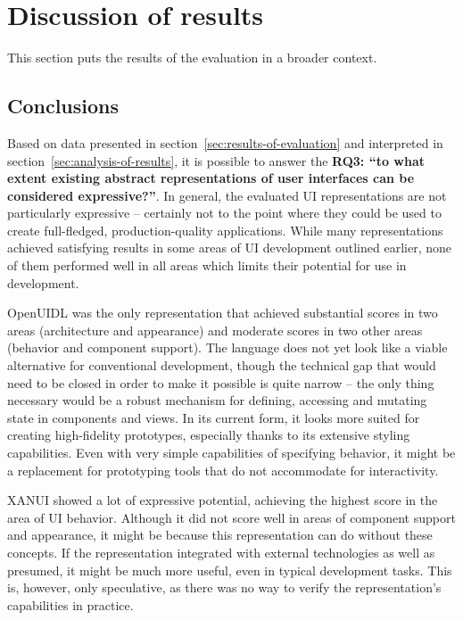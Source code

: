 \section{Discussion of results}\label{sec:evaluation-discussion-of-results}

This section puts the results of the evaluation in a broader context.

\subsection{Conclusions}\label{subsec:conclusions}

Based on data presented in section~\ref{sec:results-of-evaluation} and interpreted in section~\ref{sec:analysis-of-results}, it is possible to answer the \textbf{RQ3: \enquote{to what extent existing abstract representations of user interfaces can be considered expressive?}}.
In general, the evaluated UI representations are not particularly expressive -- certainly not to the point where they could be used to create full-fledged, production-quality applications.
While many representations achieved satisfying results in some areas of UI development outlined earlier, none of them performed well in all areas which limits their potential for use in development.

OpenUIDL was the only representation that achieved substantial scores in two areas (architecture and appearance) and moderate scores in two other areas (behavior and component support).
The language does not yet look like a viable alternative for conventional development, though the technical gap that would need to be closed in order to make it possible is quite narrow -- the only thing necessary would be a robust mechanism for defining, accessing and mutating state in components and views.
In its current form, it looks more suited for creating high-fidelity prototypes, especially thanks to its extensive styling capabilities.
Even with very simple capabilities of specifying behavior, it might be a replacement for prototyping tools that do not accommodate for interactivity.

XANUI showed a lot of expressive potential, achieving the highest score in the area of UI behavior.
Although it did not score well in areas of component support and appearance, it might be because this representation can do without these concepts.
If the representation integrated with external technologies as well as presumed, it might be much more useful, even in typical development tasks.
This is, however, only speculative, as there was no way to verify the representation's capabilities in practice.

